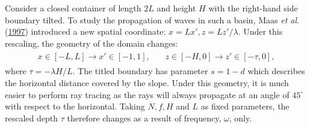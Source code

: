 \documentclass[a4paper]{article}
\numberwithin{equation}{section}
\begin{document}
Consider a closed container of length $2L$ and height $H$ with the right-hand side boundary tilted. To study the propagation of waves in such a basin, Maas \emph{et al.} (\protect\hyperlink{ref 11}{1997}) introduced a new spatial coordinate: $x = Lx', z = Lz'/\lambda$. Under this rescaling, the geometry of the domain changes:
\begin{align*}
\begin{split}
x \in [-L, L] \longrightarrow x' \in [-1, 1], ~~~~~~~~
z \in [-H, 0] \longrightarrow z' \in [-\tau, 0], 
\end{split}
\end{align*}
where $\tau = -\lambda H/L$. The titled boundary has parameter $s = 1 - d$ which describes the horizontal distance covered by the slope. Under this geometry, it is much easier to perform ray tracing as the rays will always propagate at an angle of $45^{\circ}$ with respect to the horizontal. Taking $N, f, H$ and $L$ as fixed parameters, the rescaled depth $\tau$ therefore changes as a result of frequency, $\omega$, only.
\end{document}
